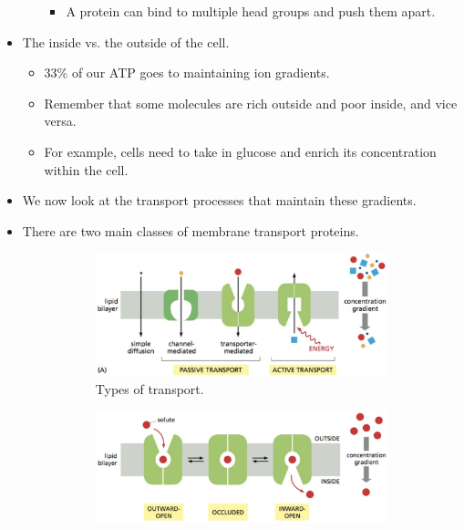 \documentclass[../notes.tex]{subfiles}
\begin{document}
\begin{itemize}
\begin{itemize}
\begin{itemize}
            \item A protein can bind to multiple head groups and push them apart.
        \end{itemize}
    \end{itemize}
    \item The inside vs. the outside of the cell.
    \begin{itemize}
        \item 33\% of our ATP goes to maintaining ion gradients.
        \item Remember that some molecules are rich outside and poor inside, and vice versa.
        \item For example, cells need to take in glucose and enrich its concentration within the cell.
    \end{itemize}
    \item We now look at the transport processes that maintain these gradients.
    \item There are two main classes of membrane transport proteins.
    \begin{figure}[h!]
        \centering
        \begin{subfigure}[b]{0.49\linewidth}
            \centering
            \includegraphics[width=0.9\linewidth]{../ExtFiles/transportTypesa.png}
            \caption{Types of transport.}
            \label{fig:transportTypesa}
        \end{subfigure}
        \begin{subfigure}[b]{0.49\linewidth}
            \centering
            \includegraphics[width=0.9\linewidth]{../ExtFiles/transportTypesb.png}

\end{subfigure}
\end{figure}
\end{itemize}
\end{document}
